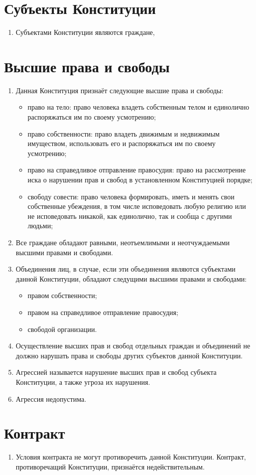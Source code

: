 
\section{Субъекты Конституции} %
\begin{enumerate}
    \item Субъектами Конституции являются граждане, 
\end{enumerate}
\section{Высшие права и свободы}
\begin{enumerate}
    \item Данная Конституция признаёт следующие высшие права и свободы:
    \begin{itemize}
        \item право на тело: право человека владеть собственным телом и единолично распоряжаться им по своему усмотрению;
        \item право собственности: право владеть движимым и недвижимым имуществом, использовать его и распоряжаться им по своему усмотрению;
        \item право на справедливое отправление правосудия: право на рассмотрение иска о нарушении прав и свобод в установленном Конституцией порядке;
        \item свободу совести: право человека формировать, иметь и менять свои собственные убеждения, в том числе исповедовать любую религию или не исповедовать никакой, как единолично, так и сообща с другими людьми;
    \end{itemize}
    \item Все граждане обладают равными, неотъемлимыми и неотчуждаемыми высшими правами и свободами.
    \item Объединения лиц, в случае, если эти объединения являются субъектами данной Конституции, обладают следущими высшими правами и свободами:
    \begin{itemize}
        \item правом собственности;
        \item правом на справедливое отправление правосудия;
        \item свободой организации.
    \end{itemize}
    \item Осуществление высших прав и свобод отдельных граждан и объединений не должно нарушать права и свободы других субъектов данной Конституции.
    \item Агрессией называется нарушение высших прав и свобод субъекта Конституции, а также угроза их нарушения.
    
    \item Агрессия недопустима.
    
\end{enumerate}
\section{Контракт}
\begin{enumerate}
    
    
    
    
    \item Условия контракта не могут противоречить данной Конституции. Контракт, противоречащий Конституции, признаётся недействительным.
\end{enumerate}
